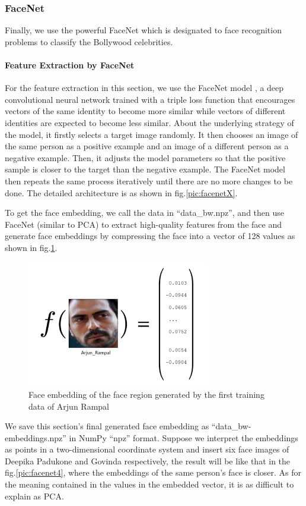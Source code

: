 \subsubsection{FaceNet}
Finally, we use the powerful FaceNet which is designated to face recognition problems to classify the Bollywood celebrities.
\paragraph{Feature Extraction by FaceNet}
For the feature extraction in this section, we use the FaceNet model \cite{schroff2015facenet}, a deep convolutional neural network trained with a triple loss function that encourages vectors of the same identity to become more similar while vectors of different identities are expected to become less similar. About the underlying strategy of the model, it firstly selects a target image randomly. It then chooses an image of the same person as a positive example and an image of a different person as a negative example. Then, it adjusts the model parameters so that the positive sample is closer to the target than the negative example. The FaceNet model then repeats the same process iteratively until there are no more changes to be done. The detailed architecture is as shown in fig.\ref{pic:facenetX}. 

To get the face embedding, we call the data in ``data\_bw.npz'', and then use FaceNet (similar to PCA) to extract high-quality features from the face and generate face embeddings by compressing the face into a vector of 128 values as shown in fig.\ref{pic:facenet3}. 

\begin{figure}[H]
    \centering\includegraphics[width=8cm]{./figures/facenet3.png}
    \caption{Face embedding of the face region generated by the first training data of Arjun Rampal}
    \label{pic:facenet3}
\end{figure}

We save this section's final generated face embedding as ``data\_bw-embeddings.npz'' in NumPy ``npz'' format. Suppose we interpret the embeddings as points in a two-dimensional coordinate system and insert six face images of Deepika Padukone and Govinda respectively, the result will be like that in the fig.\ref{pic:facenet4}, where the embeddings of the same person's face is closer. As for the meaning contained in the values in the embedded vector, it is as difficult to explain as PCA. 

